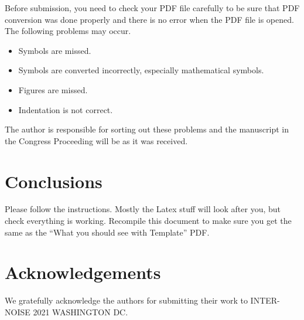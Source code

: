 \noindent
Before submission, you need to check your PDF file carefully to be sure that PDF conversion was done properly and there is no error when the PDF file is opened. The following problems may occur.
\begin{itemize}[noitemsep]
\item
Symbols are missed.
\item
Symbols are converted incorrectly, especially mathematical symbols.
\item
Figures are missed.
\item
Indentation is not correct.
\end{itemize}

The author is responsible for sorting out these problems and the manuscript  in the Congress Proceeding will be as it was received.

\section{Conclusions}

\noindent
Please follow the instructions.  Mostly the Latex stuff will look after you, but check everything is working. 
Recompile this document to make sure you get the same as the ``What you should see with Template'' PDF.    

\section*{Acknowledgements} 

\noindent
We gratefully acknowledge the authors for submitting their work to INTER-NOISE 2021 WASHINGTON DC.

